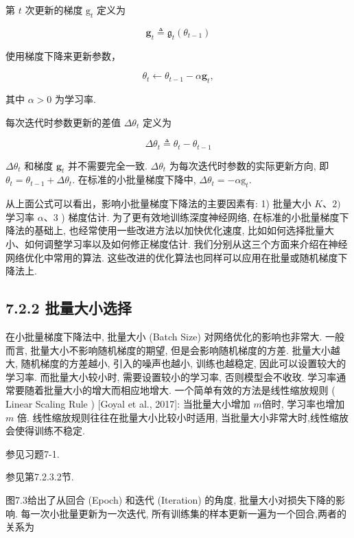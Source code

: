 \documentclass[10pt]{article}
\begin{document}
第 $t$ 次更新的梯度 $\mathrm{g}_{t}$ 定义为


\begin{equation*}
\mathbf{g}_{t} \triangleq \mathfrak{g}_{t}\left(\theta_{t-1}\right) \tag{7.2}
\end{equation*}


使用梯度下降来更新参数，


\begin{equation*}
\theta_{t} \leftarrow \theta_{t-1}-\alpha \mathbf{g}_{t}, \tag{7.3}
\end{equation*}


其中 $\alpha>0$ 为学习率.

每次迭代时参数更新的差值 $\Delta \theta_{t}$ 定义为


\begin{equation*}
\Delta \theta_{t} \triangleq \theta_{t}-\theta_{t-1} \tag{7.4}
\end{equation*}


$\Delta \theta_{t}$ 和梯度 $\mathbf{g}_{t}$ 并不需要完全一致. $\Delta \theta_{t}$ 为每次迭代时参数的实际更新方向, 即 $\theta_{t}=\theta_{t-1}+\Delta \theta_{t}$. 在标准的小批量梯度下降中, $\Delta \theta_{t}=-\alpha \mathrm{g}_{t}$.

从上面公式可以看出，影响小批量梯度下降法的主要因素有: 1) 批量大小 $K 、 2)$ 学习率 $\alpha 、 3$ ) 梯度估计. 为了更有效地训练深度神经网络, 在标准的小批量梯度下降法的基础上, 也经常使用一些改进方法以加快优化速度, 比如如何选择批量大小、如何调整学习率以及如何修正梯度估计. 我们分别从这三个方面来介绍在神经网络优化中常用的算法. 这些改进的优化算法也同样可以应用在批量或随机梯度下降法上.

\subsection*{7.2.2 批量大小选择}
在小批量梯度下降法中, 批量大小 (Batch Size) 对网络优化的影响也非常大. 一般而言, 批量大小不影响随机梯度的期望, 但是会影响随机梯度的方差. 批量大小越大, 随机梯度的方差越小, 引入的噪声也越小, 训练也越稳定, 因此可以设置较大的学习率. 而批量大小较小时, 需要设置较小的学习率, 否则模型会不收玫. 学习率通常要随着批量大小的增大而相应地增大. 一个简单有效的方法是线性缩放规则 ( Linear Scaling Rule ) [Goyal et al., 2017]: 当批量大小增加 $m$倍时, 学习率也增加 $m$ 倍. 线性缩放规则往往在批量大小比较小时适用, 当批量大小非常大时,线性缩放会使得训练不稳定.

参见习题7-1.

参见第7.2.3.2节.

图7.3给出了从回合 (Epoch) 和迭代 (Iteration) 的角度, 批量大小对损失下降的影响. 每一次小批量更新为一次迭代, 所有训练集的样本更新一遍为一个回合,两者的关系为
\end{document}
